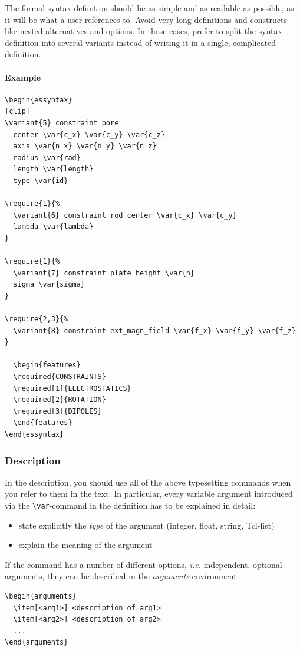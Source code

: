 \documentclass[
a4paper,                        %
11pt,                           %
twoside,                        %
footsepline,                    %
headsepline,                    %
headexclude,                    %
footexclude,                    %
pagesize,                       %
bibtotocnumbered,               %
idxtotoc                        %
]{scrartcl}
\newcommand{\ie}{\textit{i.e.}\xspace}
\begin{document}
The formal syntax definition should be as simple and as readable as
possible, as it will be what a user references to. Avoid very long
definitions and constructs like nested alternatives and options.  In
those cases, prefer to split the syntax definition into several
variants instead of writing it in a single, complicated definition.

\paragraph{Example}
\begin{verbatim}
\begin{essyntax}
[clip]
\variant{5} constraint pore 
  center \var{c_x} \var{c_y} \var{c_z} 
  axis \var{n_x} \var{n_y} \var{n_z} 
  radius \var{rad}
  length \var{length} 
  type \var{id} 

\require{1}{%
  \variant{6} constraint rod center \var{c_x} \var{c_y} 
  lambda \var{lambda}
} 
  
\require{1}{%
  \variant{7} constraint plate height \var{h}
  sigma \var{sigma} 
}
  
\require{2,3}{%
  \variant{8} constraint ext_magn_field \var{f_x} \var{f_y} \var{f_z} 
}

  \begin{features}
  \required{CONSTRAINTS}
  \required[1]{ELECTROSTATICS}
  \required[2]{ROTATION}
  \required[3]{DIPOLES}
  \end{features}
\end{essyntax}
\end{verbatim}

\subsubsection{Description}

In the description, you should use all of the above typesetting
commands when you refer to them in the text.  In particular, every
variable argument introduced via the \verb!\var!-command in the
definition has to be explained in detail:
\begin{itemize}
\item state explicitly the \emph{type} of the argument (integer,
  float, string, Tcl-list)
\item explain the meaning of the argument
\end{itemize}

If the command has a number of different options, \ie independent,
optional arguments, they can be described in the \emph{arguments}
environment:
\begin{verbatim}
\begin{arguments}
  \item[<arg1>] <description of arg1>
  \item[<arg2>] <description of arg2>
  ...
\end{arguments}
\end{verbatim}
\end{document}
